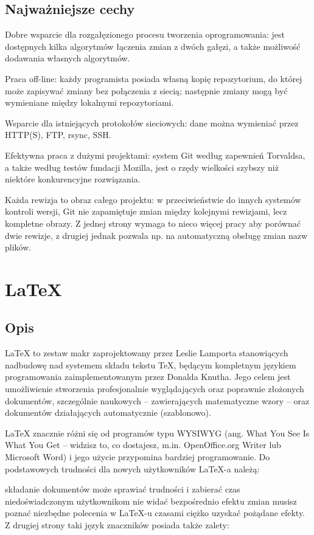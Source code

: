 \documentclass{article}
\begin{document}
\subsection{Najważniejsze cechy}
Dobre wsparcie dla rozgałęzionego procesu tworzenia oprogramowania: jest dostępnych kilka algorytmów łączenia zmian z dwóch gałęzi, a także możliwość dodawania własnych algorytmów.

Praca off-line: każdy programista posiada własną kopię repozytorium, do której może zapisywać zmiany bez połączenia z siecią; następnie zmiany mogą być wymieniane między lokalnymi repozytoriami.

Wsparcie dla istniejących protokołów sieciowych: dane można wymieniać przez HTTP(S), FTP, rsync, SSH.

Efektywna praca z dużymi projektami: system Git według zapewnień Torvaldsa, a także według testów fundacji Mozilla, jest o rzędy wielkości szybszy niż niektóre konkurencyjne rozwiązania.

Każda rewizja to obraz całego projektu: w przeciwieństwie do innych systemów kontroli wersji, Git nie zapamiętuje zmian między kolejnymi rewizjami, lecz kompletne obrazy. Z jednej strony wymaga to nieco więcej pracy aby porównać dwie rewizje, z drugiej jednak pozwala np. na automatyczną obsługę zmian nazw plików.

\newpage
\section{LaTeX}
\subsection{Opis}
LaTeX to zestaw makr zaprojektowany przez Leslie Lamporta stanowiących nadbudowę nad systemem składu tekstu TeX, będącym kompletnym językiem programowania zaimplementowanym przez Donalda Knutha. Jego celem jest umożliwienie stworzenia profesjonalnie wyglądających oraz poprawnie złożonych dokumentów, szczególnie naukowych – zawierających matematyczne wzory – oraz dokumentów działających automatycznie (szablonowo).

LaTeX znacznie różni się od programów typu WYSIWYG (ang. What You See Is What You Get – widzisz to, co dostajesz, m.in. OpenOffice.org Writer lub Microsoft Word) i jego użycie przypomina bardziej programowanie. Do podstawowych trudności dla nowych użytkowników LaTeX-a należą:

składanie dokumentów może sprawiać trudności i zabierać czas niedoświadczonym użytkownikom
nie widać bezpośrednio efektu zmian
musisz poznać niezbędne polecenia w LaTeX-u
czasami ciężko uzyskać pożądane efekty.
Z drugiej strony taki język znaczników posiada także zalety:
\end{document}
